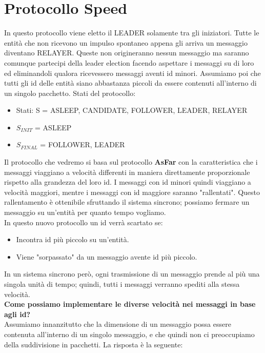 \section{Protocollo Speed}
In questo protocollo viene eletto il LEADER solamente tra gli iniziatori. Tutte le entità che non ricevono un impulso spontaneo appena gli arriva un messaggio diventano RELAYER. Queste non origineranno nessun messaggio ma saranno comunque partecipi della leader election facendo aspettare i messaggi su di loro ed eliminandoli qualora ricevessero messaggi aventi id minori. Assumiamo poi che tutti gli id delle entità siano abbastanza piccoli da essere contenuti all'interno di un singolo pacchetto.
Stati del protocollo:
\begin{itemize}
    \item Stati: S = ASLEEP, CANDIDATE, FOLLOWER, LEADER, RELAYER
    \item        $S_{INIT}$ = ASLEEP
    \item        $S_{FINAL}$ = FOLLOWER, LEADER
\end{itemize}
Il protocollo che vedremo si basa sul protocollo \textbf{AsFar} con la caratteristica che i messaggi viaggiano a velocità differenti in maniera direttamente proporzionale rispetto alla grandezza del loro id. I messaggi con id minori quindi viaggiano a velocità maggiori, mentre i messaggi con id maggiore saranno "rallentati". Questo rallentamento è ottenibile sfruttando il sistema sincrono; possiamo fermare un messaggio su un'entità per quanto tempo vogliamo.\\
In questo nuovo protocollo un id verrà scartato se:
\begin{itemize}
    \item Incontra id più piccolo su un'entità.
    \item Viene "sorpassato" da un messaggio avente id più piccolo.
\end{itemize}
In un sistema sincrono però, ogni trasmissione di un messaggio prende al più una singola unità di tempo; quindi, tutti i messaggi verranno spediti alla stessa velocità.\\ \textbf{Come possiamo implementare le diverse velocità nei messaggi in base agli id?}\\
Assumiamo innanzitutto che la dimensione di un messaggio possa essere contenuta all'interno di un singolo messaggio, e che quindi non ci preoccupiamo della suddivisione in pacchetti. La risposta è la seguente:
